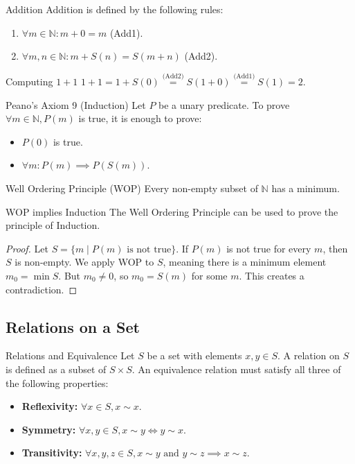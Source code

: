 \documentclass[11pt, a4paper]{article}
\newcommand{\N}{\mathbb{N}}
\begin{document}
\begin{definition}{Addition}{}
Addition is defined by the following rules:
\begin{enumerate}
    \item $\forall m \in \N: m+0 = m$ (Add1).
    \item $\forall m, n \in \N: m+S(n) = S(m+n)$ (Add2).
\end{enumerate}
\end{definition}

\begin{example}{Computing $1+1$}{}
$1+1 = 1+S(0) \stackrel{\text{(Add2)}}{=} S(1+0) \stackrel{\text{(Add1)}}{=} S(1) = 2$.
\end{example}

\begin{theorem}{Peano's Axiom 9 (Induction)}{}
Let $P$ be a unary predicate. To prove $\forall m \in \N, P(m)$ is true, it is enough to prove:
\begin{itemize}
    \item $P(0)$ is true.
    \item $\forall m: P(m) \implies P(S(m))$.
\end{itemize}
\end{theorem}

\begin{theorem}{Well Ordering Principle (WOP)}{}
Every non-empty subset of $\N$ has a minimum.
\end{theorem}

\begin{proposition}{WOP implies Induction}{}
The Well Ordering Principle can be used to prove the principle of Induction.
\end{proposition}
\begin{proof}
Let $S = \{m \mid P(m) \text{ is not true}\}$. If $P(m)$ is not true for every $m$, then $S$ is non-empty. We apply WOP to $S$, meaning there is a minimum element $m_0 = \min S$. But $m_0 \neq 0$, so $m_0 = S(m)$ for some $m$. This creates a contradiction.
\end{proof}

\subsection{Relations on a Set}

\begin{definition}{Relations and Equivalence}{}
Let $S$ be a set with elements $x, y \in S$. A relation on $S$ is defined as a subset of $S \times S$.
An equivalence relation must satisfy all three of the following properties:
\begin{itemize}
    \item \textbf{Reflexivity:} $\forall x \in S, x \sim x$.
    \item \textbf{Symmetry:} $\forall x, y \in S, x \sim y \iff y \sim x$.
    \item \textbf{Transitivity:} $\forall x, y, z \in S, x \sim y \text{ and } y \sim z \implies x \sim z$.
\end{itemize}
\end{definition}
\end{document}
